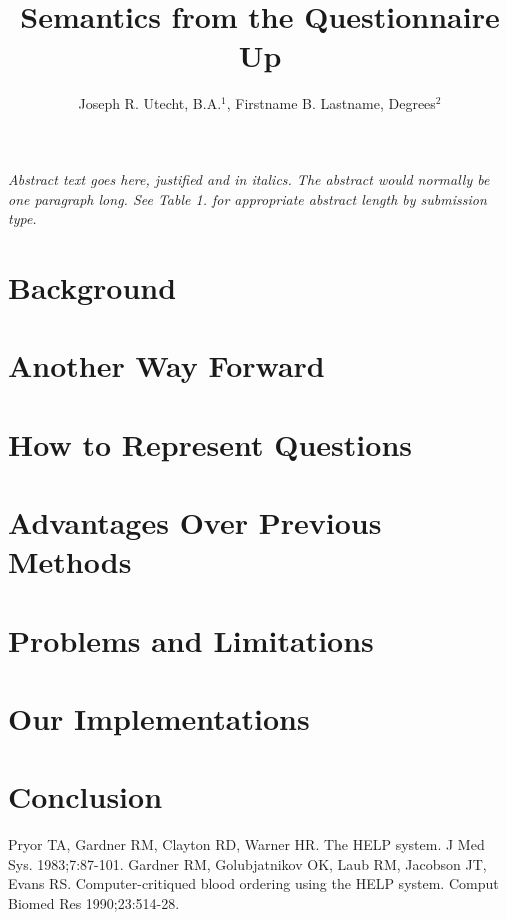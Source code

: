 \documentclass{amia}
\begin{document}
\title{Semantics from the Questionnaire Up}

\author{Joseph R. Utecht, B.A.$^{1}$, Firstname B. Lastname, Degrees$^{2}$}


\maketitle


\textit{Abstract text goes here, justified and in italics.  The abstract would normally be one paragraph long.  See Table 1. for appropriate abstract length by submission type.}

\section*{Background}
\lipsum[1-3]

\section*{Another Way Forward}
\lipsum[4-9]

\section*{How to Represent Questions}
\lipsum[10-15]

\section*{Advantages Over Previous Methods}
\lipsum[16-19]

\section*{Problems and Limitations}
\lipsum[20-21]

\section*{Our Implementations}
\lipsum[21-30]

\section*{Conclusion}
\lipsum[30-33]

\makeatletter
\renewcommand{\@biblabel}[1]{\hfill #1.}
\makeatother


\begin{thebibliography}{1}
\setlength\itemsep{-0.1em}

Pryor TA, Gardner RM, Clayton RD, Warner HR. The HELP system. J Med Sys. 1983;7:87-101.
Gardner RM, Golubjatnikov OK, Laub RM, Jacobson JT, Evans RS. Computer-critiqued blood ordering using the HELP system. Comput Biomed Res 1990;23:514-28.



\end{thebibliography}
\end{document}
